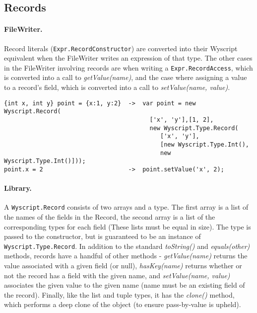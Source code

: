 
\subsection{Records}
\label{c_types_record}

\paragraph{FileWriter.} Record literals (\lstinline{Expr.RecordConstructor}) are converted into their Wyscript equivalent when the FileWriter writes an expression of that type. The other cases in the FileWriter involving records are when writing a \lstinline{Expr.RecordAccess}, which is converted into a call to {\em getValue(name)}, and the case where assigning a value to a record's field, which is converted into a call to {\em setValue(name, value)}.

\begin{lstlisting}
{int x, int y} point = {x:1, y:2}  ->  var point = new Wyscript.Record(
                                         ['x', 'y'],[1, 2],
                                         new Wyscript.Type.Record(
                                            ['x', 'y'],
                                            [new Wyscript.Type.Int(),
                                            new Wyscript.Type.Int()]));
point.x = 2                        ->  point.setValue('x', 2);
\end{lstlisting}

\paragraph{Library.} A \lstinline{Wyscript.Record} consists of two arrays and a type. The first array is a list of the names of the fields in the Record, the second array is a list of the corresponding types for each field (These lists must be equal in size). The type is passed to the constructor, but is guaranteed to be an instance of \lstinline{Wyscript.Type.Record}. In addition to the standard {\em toString()} and {\em equals(other)} methods, records have a handful of other methods - {\em getValue(name)} returns the value associated with a given field (or null), {\em hasKey(name)} returns whether or not the record has a field with the given name, and {\em setValue(name, value)} associates the given value to the given name (name must be an existing field of the record). Finally, like the list and tuple types, it has the {\em clone()} method, which performs a deep clone of the object (to ensure pass-by-value is upheld).

